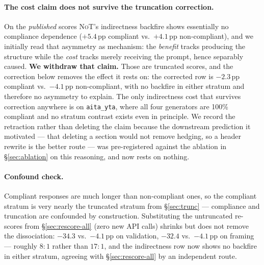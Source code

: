 \documentclass[11pt]{article}
\newcommand{\NoT}{\textsc{NoT}}
\newcommand{\aitayta}{\texttt{aita\_yta}}
\begin{document}
\paragraph{The cost claim does not survive the truncation correction.} On the
\emph{published} scores \NoT{}'s indirectness backfire shows essentially no
compliance dependence ($+5.4$\,pp compliant vs.\ $+4.1$\,pp non-compliant), and
we initially read that asymmetry as mechanism: the \emph{benefit} tracks
producing the structure while the \emph{cost} tracks merely receiving the
prompt, hence separably caused. \textbf{We withdraw that claim.} Those are
truncated scores, and the correction below removes the effect it rests on: the
corrected row is $-2.3$\,pp compliant vs.\ $-4.1$\,pp non-compliant, with no
backfire in either stratum and therefore no asymmetry to explain. The only
indirectness cost that survives correction anywhere is on \aitayta{}, where all
four generators are 100\% compliant and no stratum contrast exists even in
principle. We record the retraction rather than deleting the claim because the
downstream prediction it motivated --- that deleting a section would not remove
hedging, so a header rewrite is the better route --- was pre-registered against
the ablation in \S\ref{sec:ablation} on this reasoning, and now rests on nothing.

\paragraph{Confound check.} Compliant responses are much longer than
non-compliant ones, so the compliant stratum is very nearly the truncated
stratum from \S\ref{sec:trunc} --- compliance and truncation are confounded by
construction. Substituting the untruncated re-scores from
\S\ref{sec:rescore-all} (zero new API calls) shrinks but does not remove the
dissociation: $-34.3$ vs.\ $-4.1$\,pp on validation, $-32.4$ vs.\ $-4.1$\,pp on
framing --- roughly $8{:}1$ rather than $17{:}1$, and the indirectness row now
shows no backfire in either stratum, agreeing with \S\ref{sec:rescore-all} by an
independent route.
\end{document}
